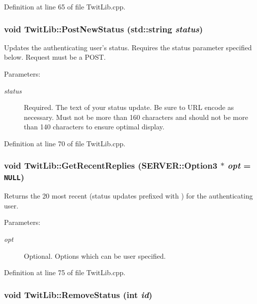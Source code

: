 Definition at line 65 of file TwitLib.cpp.\hypertarget{classTwitLib_971192c761fcd4a7415d2c533b4e5015}{
\subsubsection{\setlength{\rightskip}{0pt plus 5cm}void TwitLib::PostNewStatus (std::string {\em status})}}
\label{classTwitLib_971192c761fcd4a7415d2c533b4e5015}


Updates the authenticating user's status. Requires the status parameter specified below. Request must be a POST. \begin{Desc}
\item[Parameters:]
\begin{description}
\item[{\em status}]Required. The text of your status update. Be sure to URL encode as necessary. Must not be more than 160 characters and should not be more than 140 characters to ensure optimal display. \end{description}
\end{Desc}


Definition at line 70 of file TwitLib.cpp.\hypertarget{classTwitLib_6fe55d138859c38417a124d9a5fd4c27}{
\subsubsection{\setlength{\rightskip}{0pt plus 5cm}void TwitLib::GetRecentReplies ({\bf SERVER::Option3} $\ast$ {\em opt} = {\tt NULL})}}
\label{classTwitLib_6fe55d138859c38417a124d9a5fd4c27}


Returns the 20 most recent  (status updates prefixed with ) for the authenticating user. \begin{Desc}
\item[Parameters:]
\begin{description}
\item[{\em opt}]Optional. Options which can be user specified. \end{description}
\end{Desc}


Definition at line 75 of file TwitLib.cpp.\hypertarget{classTwitLib_2a44ccbe158bcd126a5411f7644120b3}{
\subsubsection{\setlength{\rightskip}{0pt plus 5cm}void TwitLib::RemoveStatus (int {\em id})}}
\label{classTwitLib_2a44ccbe158bcd126a5411f7644120b3}


